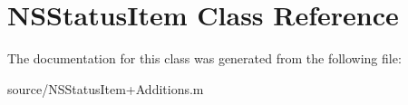 \hypertarget{class_n_s_status_item}{
\section{NSStatusItem Class Reference}
\label{class_n_s_status_item}
}


The documentation for this class was generated from the following file:\begin{DoxyCompactItemize}
\item 
source/NSStatusItem+Additions.m\end{DoxyCompactItemize}
